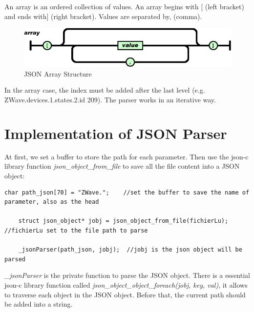 An array is an ordered collection of values. An array begins with [ (left bracket) and ends with] (right bracket). Values are separated by, (comma).
\begin{figure}[htbp]
	\centering
		\includegraphics[width=12cm]{Figures/jsonarray.png}
	\caption[JSON Array Structure]{JSON Array Structure}
\end{figure}

In the array case, the index must be added after the last level (e.g. ZWave.devices.1.states.2.id 209). The parser works in an iterative way.

\section{Implementation of JSON Parser}

At first, we set a buffer to store the path for each parameter. Then use the json-c library function \textit{json\_object\_from\_file} to save all the file content into a JSON object:

\begin{lstlisting}[mathescape]
    char path_json[70] = "ZWave.";    //set the buffer to save the name of parameter, also as the head

    struct json_object* jobj = json_object_from_file(fichierLu);  //fichierLu set to the file path to parse

    _jsonParser(path_json, jobj);  //jobj is the json object will be parsed
\end{lstlisting}


\textit{\_jsonParser} is the private function to parse the JSON object. There is a essential json-c library function called \textit{json\_object\_object\_foreach(jobj, key, val)}, it allows to traverse each object in the JSON object. Before that, the current path should be added into a string.


